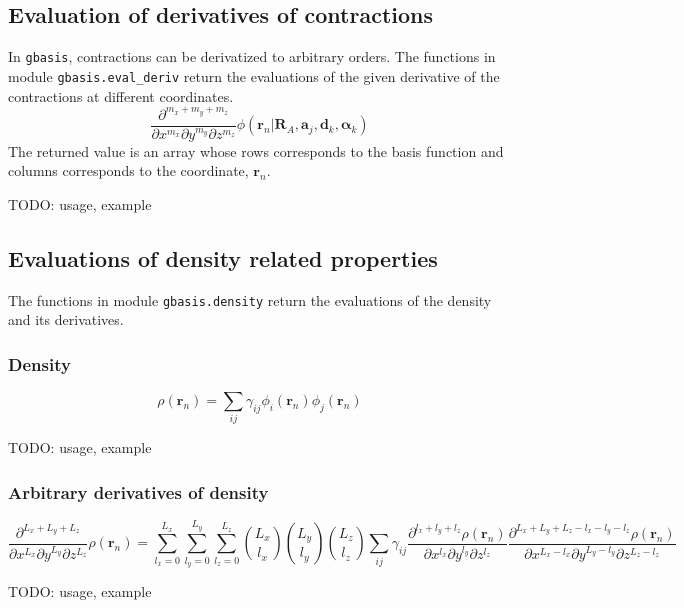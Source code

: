 \documentclass[letterpaper]{article}
\begin{document}
\subsection{Evaluation of derivatives of contractions}
In \verb|gbasis|, contractions can be derivatized to arbitrary orders.
The functions in module \verb|gbasis.eval_deriv| return the evaluations of the
given derivative of the contractions at different coordinates.
\begin{equation}
  \frac{\partial^{m_x + m_y + m_z}}{\partial x^{m_x} \partial y^{m_y} \partial z^{m_z}}
  \phi(\mathbf{r}_n | \mathbf{R}_{A}, \mathbf{a}_j, \mathbf{d}_k, \boldsymbol{\alpha}_k)
\end{equation}
The returned value is an array whose rows corresponds to the basis function and
columns corresponds to the coordinate, $\mathbf{r}_n$.

TODO: usage, example
\subsection{Evaluations of density related properties}
The functions in module \verb|gbasis.density| return the evaluations of the
density and its derivatives.
\subsubsection{Density}
\begin{equation}
  \rho(\mathbf{r}_n) = \sum_{ij} \gamma_{ij} \phi_i(\mathbf{r}_n) \phi_j(\mathbf{r}_n)
\end{equation}

TODO: usage, example
\subsubsection{Arbitrary derivatives of density}
\begin{equation}
  \frac{\partial^{L_x + L_y + L_z}}{\partial x^{L_x} \partial y^{L_y} \partial z^{L_z}}
  \rho(\mathbf{r}_n)
  =
  \sum_{l_x=0}^{L_x} \sum_{l_y=0}^{L_y} \sum_{l_z=0}^{L_z}
  \binom{L_x}{l_x} \binom{L_y}{l_y} \binom{L_z}{l_z}
  \sum_{ij} \gamma_{ij}
  \frac{\partial^{l_x + l_y + l_z} \rho(\mathbf{r}_n)}{\partial x^{l_x} \partial y^{l_y} \partial z^{l_z}}
  \frac{
    \partial^{L_x + L_y + L_z - l_x - l_y - l_z} \rho(\mathbf{r}_n)
  }{
    \partial x^{L_x - l_x} \partial y^{L_y - l_y} \partial z^{L_z - l_z}
  }
\end{equation}

TODO: usage, example
\end{document}
